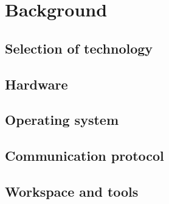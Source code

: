 \section{Background}



\subsection*{Selection of technology}

\subsection{Hardware}

\subsection{Operating system}

\subsection{Communication protocol}

\subsection{Workspace and tools}
